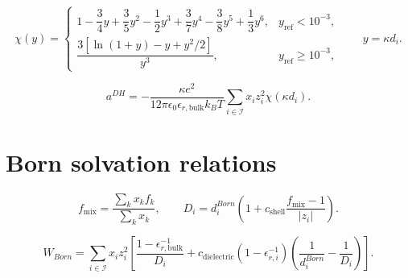 \documentclass[11pt]{article}
\begin{document}
\begin{equation}
\chi(y)=
\begin{cases}
1-\dfrac{3}{4}y+\dfrac{3}{5}y^2-\dfrac{1}{2}y^3
+\dfrac{3}{7}y^4-\dfrac{3}{8}y^5+\dfrac{1}{3}y^6,
& y_{\mathrm{ref}}<10^{-3},\\[6pt]
\dfrac{3\left[\ln(1+y)-y+y^2/2\right]}{y^3},
& y_{\mathrm{ref}}\ge10^{-3},
\end{cases}
\qquad y=\kappa d_i.
\label{eq:debye_finite_size_chi}
\end{equation}

\begin{equation}
a^{DH}=
-\frac{\kappa e^2}
{12\pi\epsilon_0\epsilon_{r,\mathrm{bulk}}k_BT}
\sum_{i\in\mathcal{I}}x_i z_i^2\chi(\kappa d_i).
\label{eq:debye_huckel_helmholtz}
\end{equation}

\section{Born solvation relations}

\begin{equation}
f_{\mathrm{mix}}=\frac{\sum_kx_kf_k}{\sum_kx_k},\qquad
D_i=d_i^{Born}\left(1+c_{\mathrm{shell}}\frac{f_{\mathrm{mix}}-1}{|z_i|}\right).
\label{eq:born_outer_shell_diameter}
\end{equation}

\begin{equation}
W_{Born}=
\sum_{i\in\mathcal{I}}x_i z_i^2
\left[
\frac{1-\epsilon_{r,\mathrm{bulk}}^{-1}}{D_i}
+c_{\mathrm{dielectric}}\left(1-\epsilon_{r,i}^{-1}\right)
\left(\frac{1}{d_i^{Born}}-\frac{1}{D_i}\right)
\right].
\label{eq:born_radial_charging_work}
\end{equation}
\end{document}
